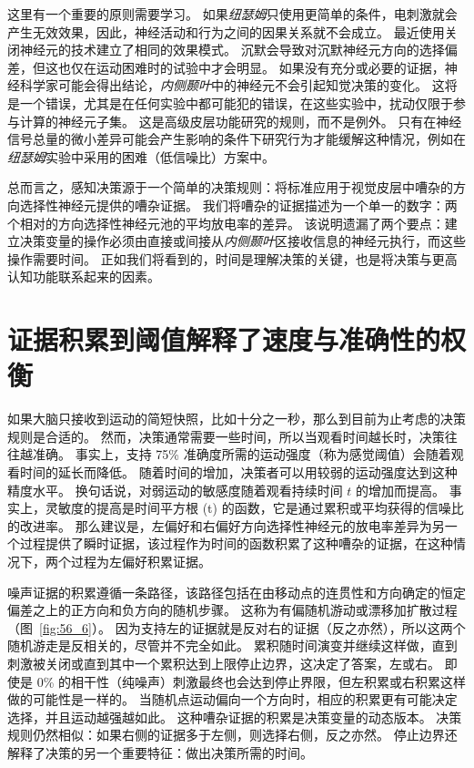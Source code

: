 这里有一个重要的原则需要学习。
如果\textit{纽瑟姆}只使用更简单的条件，电刺激就会产生无效效果，因此，神经活动和行为之间的因果关系就不会成立。
最近使用关闭神经元的技术建立了相同的效果模式。
沉默会导致对沉默神经元方向的选择偏差，但这也仅在运动困难时的试验中才会明显。
如果没有充分或必要的证据，神经科学家可能会得出结论，\textit{内侧颞叶}中的神经元不会引起知觉决策的变化。
这将是一个错误，尤其是在任何实验中都可能犯的错误，在这些实验中，扰动仅限于参与计算的神经元子集。
这是高级皮层功能研究的规则，而不是例外。
只有在神经信号总量的微小差异可能会产生影响的条件下研究行为才能缓解这种情况，例如在\textit{纽瑟姆}实验中采用的困难（低信噪比）方案中。


总而言之，感知决策源于一个简单的决策规则：将标准应用于视觉皮层中嘈杂的方向选择性神经元提供的嘈杂证据。
我们将嘈杂的证据描述为一个单一的数字：两个相对的方向选择性神经元池的平均放电率的差异。
该说明遗漏了两个要点：建立决策变量的操作必须由直接或间接从\textit{内侧颞叶}区接收信息的神经元执行，而这些操作需要时间。
正如我们将看到的，时间是理解决策的关键，也是将决策与更高认知功能联系起来的因素。



\section{证据积累到阈值解释了速度与准确性的权衡}

如果大脑只接收到运动的简短快照，比如十分之一秒，那么到目前为止考虑的决策规则是合适的。
然而，决策通常需要一些时间，所以当观看时间越长时，决策往往越准确。
事实上，支持 75\% 准确度所需的运动强度（称为感觉阈值）会随着观看时间的延长而降低。
随着时间的增加，决策者可以用较弱的运动强度达到这种精度水平。
换句话说，对弱运动的敏感度随着观看持续时间 $ t $ 的增加而提高。
事实上，灵敏度的提高是时间平方根 (t) 的函数，它是通过累积或平均获得的信噪比的改进率。
那么建议是，左偏好和右偏好方向选择性神经元的放电率差异为另一个过程提供了瞬时证据，该过程作为时间的函数积累了这种嘈杂的证据，在这种情况下，两个过程为左偏好积累证据。


噪声证据的积累遵循一条路径，该路径包括在由移动点的连贯性和方向确定的恒定偏差之上的正方向和负方向的随机步骤。
这称为有偏随机游动或漂移加扩散过程（图~\ref{fig:56_6}）。
因为支持左的证据就是反对右的证据（反之亦然），所以这两个随机游走是反相关的，尽管并不完全如此。
累积随时间演变并继续这样做，直到刺激被关闭或直到其中一个累积达到上限停止边界，这决定了答案，左或右。
即使是 0\% 的相干性（纯噪声）刺激最终也会达到停止界限，但左积累或右积累这样做的可能性是一样的。
当随机点运动偏向一个方向时，相应的积累更有可能决定选择，并且运动越强越如此。
这种嘈杂证据的积累是决策变量的动态版本。
决策规则仍然相似：如果右侧的证据多于左侧，则选择右侧，反之亦然。
停止边界还解释了决策的另一个重要特征：做出决策所需的时间。


